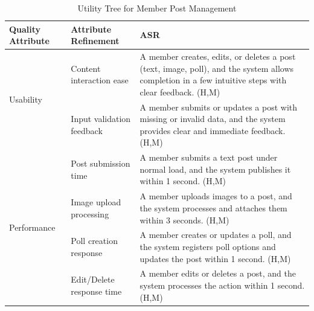 \documentclass{article}
\begin{document}
\begin{table}[H]
    \centering
    \caption{Utility Tree for Member Post Management}
    \begin{tabular}{|p{3cm}|p{4cm}|p{7cm}|}
        \hline
        \textbf{Quality Attribute} & \textbf{Attribute Refinement}                                                                                                                        & \textbf{ASR} \\
        \hline

        \multirow{2}{*}{Usability}
                                   & Content interaction ease
                                   & A member creates, edits, or deletes a post (text, image, poll), and the system allows completion in a few intuitive steps with clear feedback. (H,M)                \\
        \cline{2-3}
                                   & Input validation feedback
                                   & A member submits or updates a post with missing or invalid data, and the system provides clear and immediate feedback. (H,M)                                        \\
        \hline

        \multirow{4}{*}{Performance}
                                   & Post submission time
                                   & A member submits a text post under normal load, and the system publishes it within 1 second. (H,M)                                                                  \\
        \cline{2-3}
                                   & Image upload processing
                                   & A member uploads images to a post, and the system processes and attaches them within 3 seconds. (H,M)                                                               \\
        \cline{2-3}
                                   & Poll creation response
                                   & A member creates or updates a poll, and the system registers poll options and updates the post within 1 second. (H,M)                                               \\
        \cline{2-3}
                                   & Edit/Delete response time
                                   & A member edits or deletes a post, and the system processes the action within 1 second. (H,M)                                                                        \\
        \hline


\end{tabular}
\end{table}
\end{document}
